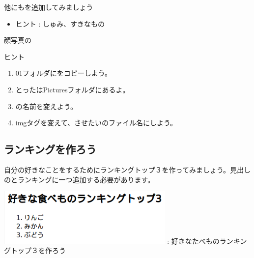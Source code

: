 \documentclass[a4paper,12pt]{jarticle}
\begin{document}
\clearpage
{}\theQuestion\label{Q:hasAnswer04-4}

他にもを追加してみましょう

\begin{itemize}
  \item ヒント : しゅみ、すきなもの
\end{itemize}
\theQuestion\label{Q:hasAnswer04-5}

顔写真の

ヒント

\begin{enumerate}
  \item
        01フォルダにをコピーしよう。
  \item とったはPicturesフォルダにあるよ。
  \item {}の名前を変えよう。
  \item
        imgタグを変えて、させたいのファイル名にしよう。
\end{enumerate}

\bigskip


\bigskip

\clearpage
{}
\subsection{\theExercise ランキングを作ろう}
\addtocounter{Exercise}{-1}\label{E:HTML_5}
自分の好きなことをするためにランキングトップ３を作ってみましょう。見出しのとランキングに一つ追加する必要があります。



\bigskip


\begin{minipage}{\textwidth}
  {\upshape
    \includegraphics[width=0.65\textwidth]{textbook-img178.png}
    \newline
    :
    好きなたべものランキングトップ３を作ろう}
\end{minipage}
\end{document}
